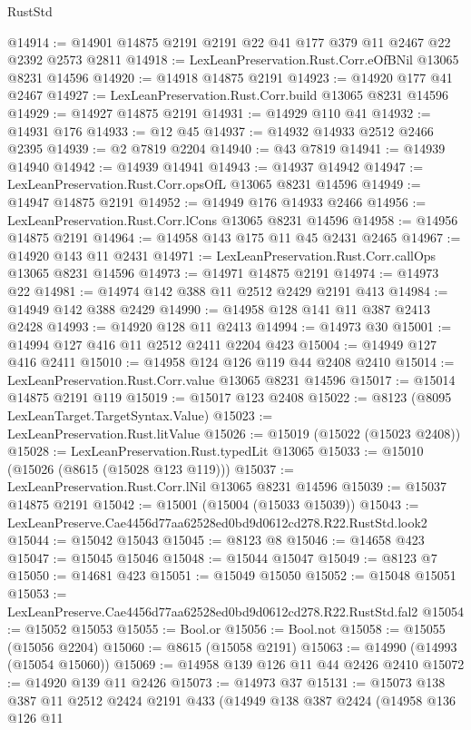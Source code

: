 \begin{lexlean}{RustStd}
\begin{coremodule}
@14914 := @14901 @14875 @2191 @2191 @22 @41 @177 @379 @11 @2467 @22 @2392 @2573 @2811
@14918 := LexLeanPreservation.Rust.Corr.eOfBNil @13065 @8231 @14596
@14920 := @14918 @14875 @2191
@14923 := @14920 @177 @41 @2467
@14927 := LexLeanPreservation.Rust.Corr.build @13065 @8231 @14596
@14929 := @14927 @14875 @2191
@14931 := @14929 @110 @41
@14932 := @14931 @176
@14933 := @12 @45
@14937 := @14932 @14933 @2512 @2466 @2395
@14939 := @2 @7819 @2204
@14940 := @43 @7819
@14941 := @14939 @14940
@14942 := @14939 @14941
@14943 := @14937 @14942
@14947 := LexLeanPreservation.Rust.Corr.opsOfL @13065 @8231 @14596
@14949 := @14947 @14875 @2191
@14952 := @14949 @176 @14933 @2466
@14956 := LexLeanPreservation.Rust.Corr.lCons @13065 @8231 @14596
@14958 := @14956 @14875 @2191
@14964 := @14958 @143 @175 @11 @45 @2431 @2465
@14967 := @14920 @143 @11 @2431
@14971 := LexLeanPreservation.Rust.Corr.callOps @13065 @8231 @14596
@14973 := @14971 @14875 @2191
@14974 := @14973 @22
@14981 := @14974 @142 @388 @11 @2512 @2429 @2191 @413
@14984 := @14949 @142 @388 @2429
@14990 := @14958 @128 @141 @11 @387 @2413 @2428
@14993 := @14920 @128 @11 @2413
@14994 := @14973 @30
@15001 := @14994 @127 @416 @11 @2512 @2411 @2204 @423
@15004 := @14949 @127 @416 @2411
@15010 := @14958 @124 @126 @119 @44 @2408 @2410
@15014 := LexLeanPreservation.Rust.Corr.value @13065 @8231 @14596
@15017 := @15014 @14875 @2191 @119
@15019 := @15017 @123 @2408
@15022 := @8123 (@8095 LexLeanTarget.TargetSyntax.Value)
@15023 := LexLeanPreservation.Rust.litValue
@15026 := @15019 (@15022 (@15023 @2408))
@15028 := LexLeanPreservation.Rust.typedLit @13065
@15033 := @15010 (@15026 (@8615 (@15028 @123 @119)))
@15037 := LexLeanPreservation.Rust.Corr.lNil @13065 @8231 @14596
@15039 := @15037 @14875 @2191
@15042 := @15001 (@15004 (@15033 @15039))
@15043 := LexLeanPreserve.Cae4456d77aa62528ed0bd9d0612cd278.R22.RustStd.look2
@15044 := @15042 @15043
@15045 := @8123 @8
@15046 := @14658 @423
@15047 := @15045 @15046
@15048 := @15044 @15047
@15049 := @8123 @7
@15050 := @14681 @423
@15051 := @15049 @15050
@15052 := @15048 @15051
@15053 := LexLeanPreserve.Cae4456d77aa62528ed0bd9d0612cd278.R22.RustStd.fal2
@15054 := @15052 @15053
@15055 := Bool.or
@15056 := Bool.not
@15058 := @15055 (@15056 @2204)
@15060 := @8615 (@15058 @2191)
@15063 := @14990 (@14993 (@15054 @15060))
@15069 := @14958 @139 @126 @11 @44 @2426 @2410
@15072 := @14920 @139 @11 @2426
@15073 := @14973 @37
@15131 := @15073
    @138
    @387
    @11
    @2512
    @2424
    @2191
    @433
    (@14949
      @138
      @387
      @2424
      (@14958
        @136
        @126
        @11

\end{coremodule}
\end{lexlean}
